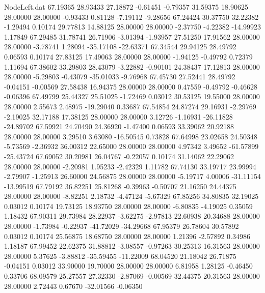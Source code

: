 \begin{filecontents}{NodeLeft.dat}
  67.19365   28.93433   27.18872    -0.61451   -0.79357   31.59375   18.90625   28.00000   28.00000   -0.93433    0.81128   -7.19112   -9.28656
  67.24424   30.37750   32.22382    -1.29494    0.10174   29.77813   14.88125   28.00000   28.00000   -2.37750   -4.22382  -14.99923    1.17849
  67.29485   31.78741   26.71906    -3.01394   -1.93957   27.51250   17.91562   28.00000   28.00000   -3.78741    1.28094  -35.17108  -22.63371
  67.34544   29.94125   28.49792     0.06593    0.10174   27.83125   17.49063   28.00000   28.00000   -1.94125   -0.49792    0.72379    1.11694
  67.38602   33.29803   28.43079    -3.22882   -0.90101   24.38437   17.12813   28.00000   28.00000   -5.29803   -0.43079  -35.01033   -9.76968
  67.45730   27.52441   28.49792    -0.04151   -0.00569   27.58438   16.94375   28.00000   28.00000    0.47559   -0.49792   -0.46628   -0.06396
  67.49799   25.44327   25.51025    -1.72469    0.03012   30.53125   19.55000   28.00000   28.00000    2.55673    2.48975  -19.29040    0.33687
  67.54854   24.87274   29.16931    -2.29769   -2.19025   32.17188   17.38125   28.00000   28.00000    3.12726   -1.16931  -26.11828  -24.89702
  67.59921   24.70490   24.36920    -1.47400    0.06593   33.39062   20.92188   28.00000   28.00000    3.29510    3.63080  -16.50545    0.73828
  67.64998   23.02658   24.50348    -5.73569   -2.36932   36.00312   22.65000   28.00000   28.00000    4.97342    3.49652  -61.57899  -25.43724
  67.69052   30.20981   26.04767    -0.22057    0.10174   31.14062   22.29062   28.00000   28.00000   -2.20981    1.95233   -2.42329    1.11782
  67.74130   33.19717   23.99994    -2.79907   -1.25913   26.60000   24.56875   28.00000   28.00000   -5.19717    4.00006  -31.11154  -13.99519
  67.79192   36.82251   25.81268    -0.39963   -0.50707   21.16250   24.44375   28.00000   28.00000   -8.82251    2.18732   -4.47124   -5.67329
  67.85256   34.80835   32.19025     0.03012    0.10174   19.73125   18.93750   28.00000   28.00000   -6.80835   -4.19025    0.35059    1.18432
  67.90311   29.73984   28.22937    -3.62275   -2.97813   22.60938   20.34688   28.00000   28.00000   -1.73984   -0.22937  -41.72029  -34.29668
  67.95379   26.78604   30.57892     0.03012    0.10174   25.56875   18.68750   28.00000   28.00000    1.21396   -2.57892    0.34986    1.18187
  67.99452   22.62375   31.88812    -3.08557   -0.97263   30.25313   16.31563   28.00000   28.00000    5.37625   -3.88812  -35.59455  -11.22009
  68.04520   21.18042   26.71875    -0.04151    0.03012   33.90000   19.70000   28.00000   28.00000    6.81958    1.28125   -0.46450    0.33706
  68.09579   25.27557   27.32330    -2.87069   -0.00569   32.44375   20.31563   28.00000   28.00000    2.72443    0.67670  -32.01566   -0.06350

\end{filecontents}

